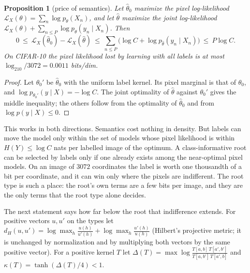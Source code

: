 \documentclass[11pt]{article}
\newtheorem{proposition}[theorem]{Proposition}
\theoremstyle{definition}
\begin{document}
\begin{proposition}[price of semantics]\label{prop:price}
Let $\hat\theta_0$ maximize the pixel log-likelihood $\mathcal L_X(\theta)=\sum_n\log p_\theta(X_n)$, and let
$\hat\theta$ maximize the joint log-likelihood $\mathcal L_X(\theta)+\sum_{n\le P}\log p_\theta(y_n\mid X_n)$. Then
\[
0\ \le\ \mathcal L_X(\hat\theta_0)-\mathcal L_X(\hat\theta)\ \le\ \sum_{n\le P}\big(\log C+\log p_{\hat\theta}(y_n\mid X_n)\big)\ \le\ P\log C .
\]
On CIFAR-10 the pixel likelihood lost by learning with all labels is at most
$\log_210/3072=0.0011$ bits/dim.
\end{proposition}
\begin{proof}
Let $\theta_0'$ be $\hat\theta_0$ with the uniform label kernel. Its pixel marginal is that of $\hat\theta_0$, and
$\log p_{\theta_0'}(y\mid X)=-\log C$. The joint optimality of $\hat\theta$ against $\theta_0'$ gives the middle
inequality; the others follow from the optimality of $\hat\theta_0$ and from $\log p(y\mid X)\le0$.
\end{proof}
\noindent This works in both directions. Semantics cost nothing in density. But labels can move the model only
within the set of models whose pixel likelihood is within $H(Y)\le\log C$ nats per labelled image of the
optimum. A class-informative root can be selected by labels only if one already exists among the
near-optimal pixel models. On an image of $3072$ coordinates the label is worth one thousandth of a bit
per coordinate, and it can win only where the pixels are indifferent. The root type is such a place: the
root's own terms are a few bits per image, and they are the only terms that the root type alone decides.

The next statement says how far below the root that indifference extends. For positive vectors $u,u'$ on
the types let $d_H(u,u')=\log\max_h\frac{u(h)}{u'(h)}+\log\max_h\frac{u'(h)}{u(h)}$ (Hilbert's projective
metric; it is unchanged by normalization and by multiplying both vectors by the same positive vector). For a
positive kernel $T$ let $\Delta(T)=\max\log\frac{T[a,b]\,T[a',b']}{T[a,b']\,T[a',b]}$ and
$\kappa(T)=\tanh(\Delta(T)/4)<1$.
\end{document}
